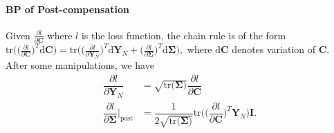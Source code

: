 \documentclass[10pt,twocolumn,letterpaper]{article}
\begin{document}
\paragraph{BP of Post-compensation} Given $\frac{\partial l}{\partial \mathbf{C}}$ where $l$ is the loss function, the chain rule is of the form 
$
\mathrm{tr}\big(\big(\frac{\partial l}{\partial \mathbf{C}}\big)^{T}\mathrm{d}\mathbf{C}\big)=\mathrm{tr}\big(\big(\frac{\partial l}{\partial \mathbf{Y}_{N}}\big)^{T}\mathrm{d}\mathbf{Y}_{N}+\big(\frac{\partial l}{\partial \boldsymbol{\Sigma}}\big)^{T}\mathrm{d}\boldsymbol{\Sigma}\big), 
$
where $\mathrm{d}\mathbf{C}$ denotes variation of $\mathbf{C}$. After some manipulations, we have
\begin{align}\label{equ:BP-post-trace}
\dfrac{\partial l}{\partial \mathbf{Y}_{N}}&=\sqrt{\mathrm{tr}(\boldsymbol{\Sigma)}}\dfrac{\partial l}{\partial \mathbf{C}}  \nonumber \\
\dfrac{\partial l}{\partial \boldsymbol{\Sigma}}\Big|_{\mathrm{post}}&=\dfrac{1}{2\sqrt{\mathrm{tr}(\boldsymbol{\Sigma)}}}\mathrm{tr}\Big(\Big(\dfrac{\partial l}{\partial \mathbf{C}}\Big)^{T}\mathbf{Y}_{N}\Big)\mathbf{I}.
\end{align}
\end{document}
